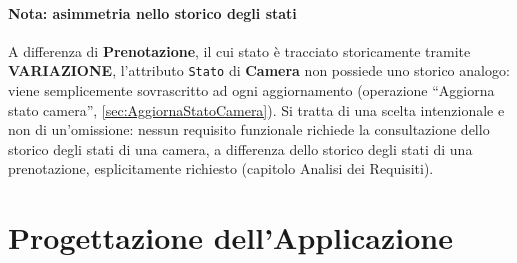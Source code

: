 \documentclass[a4paper,12pt]{report}
\begin{document}
\subsubsection*{Nota: asimmetria nello storico degli stati}

A differenza di \textbf{Prenotazione}, il cui stato è tracciato
storicamente tramite \textbf{VARIAZIONE}, l'attributo \texttt{Stato} di
\textbf{Camera} non possiede uno storico analogo: viene semplicemente
sovrascritto ad ogni aggiornamento (operazione ``Aggiorna stato camera'',
\cref{sec:AggiornaStatoCamera}). Si tratta di una scelta intenzionale e
non di un'omissione: nessun requisito funzionale richiede la
consultazione dello storico degli stati di una camera, a differenza dello
storico degli stati di una prenotazione, esplicitamente richiesto
(capitolo Analisi dei Requisiti).

\chapter{Progettazione dell'Applicazione}

\end{document}

